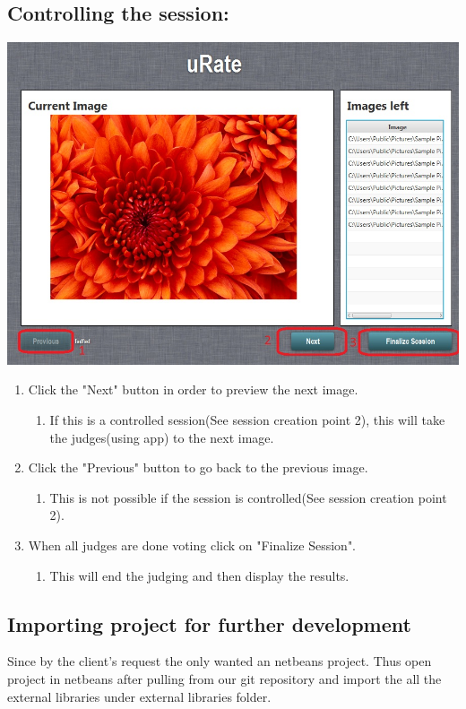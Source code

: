 \documentclass[10pt,a4paper]{article}
\begin{document}
\subsection{Controlling the session:}
\includegraphics[scale=0.5]{Pictures/serverRunning.jpg}
\begin{enumerate}
\item Click the "Next" button in order to preview the next image.
\begin{enumerate}
\item If this is a controlled session(See session creation point 2), this will take the judges(using app) to the next image.
\end{enumerate}
\item Click the "Previous" button to go back to the previous image.
\begin{enumerate}
\item This is not possible if the session is controlled(See session creation point 2).
\end{enumerate}
\item When all judges are done voting click on "Finalize Session".
\begin{enumerate}
\item This will end the judging and then display the results.
\end{enumerate}
\end{enumerate}
\subsection{Importing project for further development}
Since by the client's request the only wanted an netbeans project. Thus open project in netbeans after pulling from our git repository and import the all the external libraries under external libraries folder.
\end{document}
